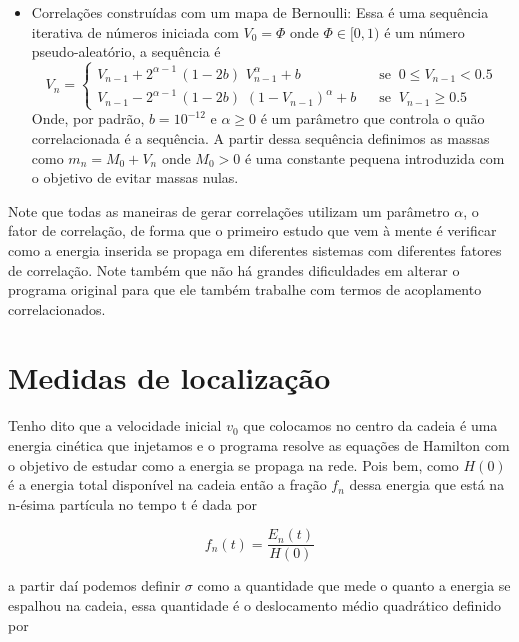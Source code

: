 \documentclass[
   article,                      %
   10pt,                         %
   openright,                    %
   oneside,                      %
   a4paper,                      %
   sumario = tradicional,        %
	chapter=TITLE,		%
	section=TITLE,		%
	subsection=TITLE,	%
	subsubsection=TITLE,%
   english,                      %
   french,                       %
   spanish,                      %
   brazil,                       %
   xcolor=table                  %
]{abntex2}
\begin{document}
\begin{itemize}[nosep]
   \item Correlações construídas com um mapa de Bernoulli:
   Essa é uma sequência iterativa de números iniciada com $V_0 = \Phi$
   onde $\Phi\in[0, 1)$ é um número pseudo-aleatório, a sequência é
   \begin{equation}
   V_n = \left \{\begin{aligned}
   V_{n-1} + 2^{\alpha-1}\,(1-2b) \,\, V_{n-1}^\alpha + b \;\;\;\;\;\;\;\;&
   \;\;\;\text{se} \;\; 0 \leq V_{n-1} < 0.5 \\
   V_{n-1} - 2^{\alpha-1}\,(1-2b) \,\, (1-V_{n-1})^\alpha + b &
   \;\;\;\text{se} \;\; V_{n-1} \geq 0.5
   \end{aligned}\right .
   \end{equation}
   Onde, por padrão, $b=10^{-12}$ e $\alpha \geq 0$
   é um parâmetro que controla o quão correlacionada é a sequência.
   A partir dessa sequência definimos as massas como $m_n = M_0 + V_n$ onde
   $M_0 > 0$ é uma constante pequena introduzida com o objetivo de evitar massas nulas.
\end{itemize}

Note que todas as maneiras de gerar correlações utilizam um parâmetro $\alpha$,
o fator de correlação, de forma que o primeiro estudo que vem à mente é
verificar como a energia inserida se propaga em diferentes sistemas com
diferentes fatores de correlação. Note também que não há grandes dificuldades
em alterar o programa original para que ele também trabalhe com termos
de acoplamento correlacionados.

\section{Medidas de localização}

Tenho dito que a velocidade inicial $v_0$ que colocamos no centro da cadeia
é uma energia cinética que injetamos e o programa resolve as equações
de Hamilton com o objetivo de estudar como a energia se propaga na rede.
Pois bem, como $H(0)$ é a energia total disponível na cadeia então
a fração $f_n$ dessa energia que está na n-ésima partícula no tempo t é
dada por

\begin{equation}
f_n(t) = \frac{E_n(t)}{H(0)}
\end{equation}

\noindent
a partir daí podemos definir $\sigma$ como a quantidade que mede o quanto
a energia se espalhou na cadeia, essa quantidade é o deslocamento médio
quadrático definido por
\end{document}
